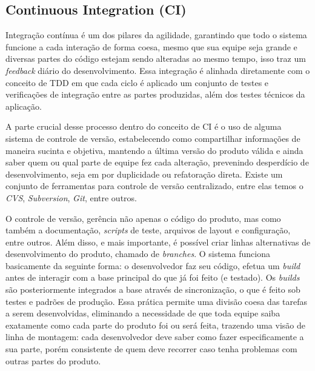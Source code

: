 \subsection{Continuous Integration (CI)}
\par Integração contínua é um dos pilares da agilidade, garantindo que todo o sistema funcione a cada interação de forma coesa, mesmo que sua equipe seja grande e diversas partes do código estejam sendo alteradas ao mesmo tempo, isso traz um \emph{feedback} diário do desenvolvimento. Essa integração é alinhada diretamente com o conceito de TDD em que cada ciclo é aplicado um conjunto de testes e verificações de integração entre as partes produzidas, além dos testes técnicos da aplicação.
\par A parte crucial desse processo dentro do conceito de CI é o uso de alguma sistema de controle de versão, estabelecendo como compartilhar informações de maneira sucinta e objetiva, mantendo a última versão do produto válida e ainda saber quem ou qual parte de equipe fez cada alteração, prevenindo desperdício de desenvolvimento, seja em por duplicidade ou refatoração direta. Existe um conjunto de ferramentas para controle de versão centralizado, entre elas temos o \emph{CVS}, \emph{Subversion}, \emph{Git}, entre outros.
\par O controle de versão, gerência não apenas o código do produto, mas como também a documentação, \emph{scripts} de teste, arquivos de layout e configuração, entre outros. Além disso, e mais importante, é possível criar linhas alternativas de desenvolvimento do produto, chamado de \emph{branches}. O sistema funciona basicamente da seguinte forma: o desenvolvedor faz seu código, efetua um \emph{build} antes de interagir com a base principal do que já foi feito (e testado). Os \emph{builds} são posteriormente integrados a base através de sincronização, o que é feito sob testes e padrões de produção. Essa prática permite uma divisão coesa das tarefas a serem desenvolvidas, eliminando a necessidade de que toda equipe saiba exatamente como cada parte do produto foi ou será feita, trazendo uma visão de linha de montagem: cada desenvolvedor deve saber como fazer especificamente a sua parte, porém consistente de quem deve recorrer caso tenha problemas com outras partes do produto.

